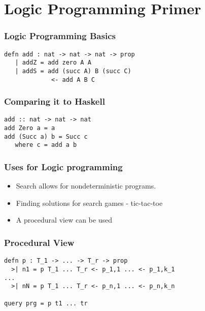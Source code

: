\section[Logic Primer]{Logic Programming Primer}

\begin{frame}[fragile]
\frametitle{Logic Programming Basics}

\begin{lstlisting}
defn add : nat -> nat -> nat -> prop
   | addZ = add zero A A
   | addS = add (succ A) B (succ C) 
             <- add A B C
\end{lstlisting}
\end{frame}


\begin{frame}[fragile]
\frametitle{Comparing it to Haskell}

\begin{lstlisting}
add :: nat -> nat -> nat
add Zero a = a
add (Succ a) b = Succ c
   where c = add a b
\end{lstlisting}
\end{frame}


\begin{frame}
\frametitle{Uses for Logic programming}
\begin{itemize}
\item Search allows for nondeterministic programs.
\item Finding solutions for search games - tic-tac-toe
\item A procedural view can be used
\end{itemize}
\end{frame}


\begin{frame}[fragile]
\frametitle{Procedural View}

\begin{lstlisting}
defn p : T_1 -> ... -> T_r -> prop
  >| n1 = p T_1 ... T_r <- p_1,1 ... <- p_1,k_1
...
  >| nN = p T_1 ... T_r <- p_n,1 ... <- p_n,k_n

query prg = p t1 ... tr
\end{lstlisting}
\end{frame}


